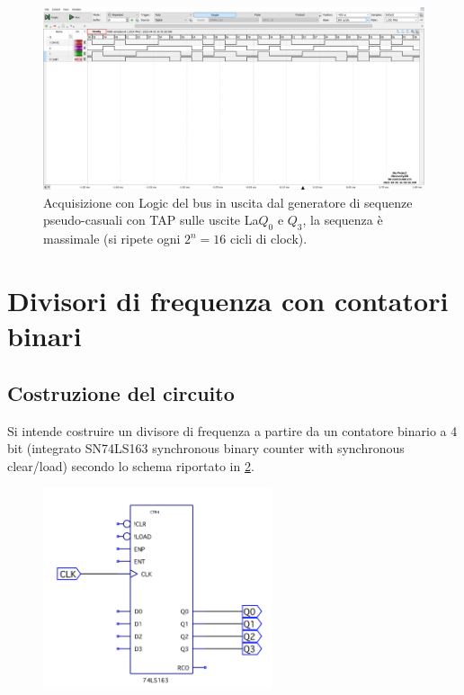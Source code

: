 \documentclass[10pt, a4paper, italian]{article}
\begin{document}
\begin{figure}[htbp]
\centering
	\includegraphics[width=\textwidth]{4.b_30}
	\caption{Acquisizione con Logic del bus in uscita dal generatore di sequenze
	pseudo-casuali con TAP sulle uscite La$Q_0$ e $Q_3$, la sequenza è massimale
	(si ripete ogni $2^n = 16$ cicli di clock).
	\label{fig: TAP_30}}
\end{figure}

\section{Divisori di frequenza con contatori binari}
\subsection{Costruzione del circuito}
Si intende costruire un divisore di frequenza a partire da un contatore
binario a 4 bit (integrato SN74LS163 synchronous binary counter with
synchronous clear/load) secondo lo schema riportato in
\cref{fig: schem_counter}. 
\begin{figure}[htbp]
\centering
	\includegraphics[width=0.6\textwidth]{schem_con}
	\caption{\label{fig: schem_counter}}
\end{figure}
\end{document}
